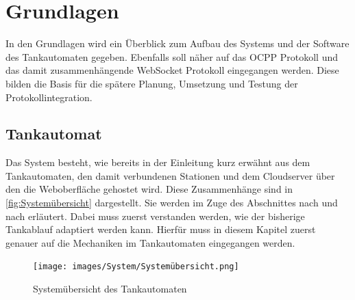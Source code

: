 \section{Grundlagen}
In den Grundlagen wird ein Überblick zum Aufbau des Systems und der Software des Tankautomaten gegeben. Ebenfalls soll näher auf das OCPP Protokoll und das damit zusammenhängende WebSocket Protokoll eingegangen werden. Diese bilden die Basis für die spätere Planung, Umsetzung und Testung der Protokollintegration.
\subsection{Tankautomat}
Das System besteht, wie bereits in der Einleitung kurz erwähnt aus dem Tankautomaten, den damit verbundenen Stationen und dem Cloudserver über den die Weboberfläche gehostet wird. Diese Zusammenhänge sind in \autoref{fig:Systemübersicht} dargestellt. Sie werden im Zuge des Abschnittes nach und nach erläutert. Dabei muss zuerst verstanden werden, wie der bisherige Tankablauf adaptiert werden kann. Hierfür muss in diesem Kapitel zuerst genauer auf die Mechaniken im Tankautomaten eingegangen werden.

\begin{figure}[H]
	\centering
	\texttt{[image: images/System/Systemübersicht.png]}
	\caption{Systemübersicht des Tankautomaten\cite{Eigene_Darstellung}}
	\label{fig:Systemübersicht}
\end{figure}


